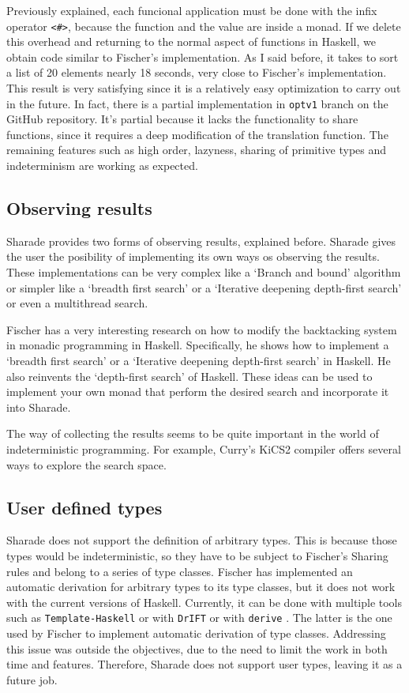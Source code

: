 \documentclass[class=article, crop=false]{standalone}
\begin{document}
Previously explained, each funcional application must be done with the infix operator
\verb`<#>`, because the function and the value are inside a monad. If we delete this overhead
and returning to the normal aspect of functions in Haskell, we obtain code similar to
Fischer's implementation. As I said before, it takes to sort a list of 20 elements nearly
18 seconds, very close to Fischer's implementation. This result is very satisfying since it
is a relatively easy optimization to carry out in the future. In fact, there is a partial
implementation in \verb`optv1` branch on the GitHub repository. It's partial because it lacks
the functionality to share functions, since it requires a deep modification of the
translation function. The remaining features such as high order, lazyness, sharing of
primitive types and indeterminism are working as expected.

\subsection{Observing results}

Sharade provides two forms of observing results, explained before. Sharade gives the user
the posibility of implementing its own ways os observing the results. These implementations
can be very complex like a `Branch and bound' algorithm or simpler like a `breadth first
search' or a `Iterative deepening depth-first search' or even a multithread search.

Fischer has a very interesting research\cite{fischer2009reinventing} on how to modify the
backtacking system in monadic programming in Haskell. Specifically, he shows how to implement
a `breadth first search' or a `Iterative deepening depth-first search' in Haskell. He also
reinvents the `depth-first search' of Haskell. These ideas can be used to implement your own
monad that perform the desired search and incorporate it into Sharade.

The way of collecting the results seems to be quite important in the world of indeterministic
programming. For example, Curry's KiCS2 compiler offers several ways to explore the search
space\cite{hanus2012search}.

\subsection{User defined types}

Sharade does not support the definition of arbitrary types. This is because those types would
be indeterministic, so they have to be subject to Fischer's Sharing rules and belong to a
series of type classes. Fischer has implemented an automatic derivation for arbitrary types
to its type classes, but it does not work with the current versions of Haskell. Currently, it
can be done with multiple tools such as
\verb`Template-Haskell`\cite {sheard2002template} or with
\verb`DrIFT`\cite{DrIFT} or with \verb`derive` \cite {derive}. The latter is the one used by
Fischer to implement automatic derivation of type classes. Addressing this issue was outside
the objectives, due to the need to limit the work in both time and features. Therefore,
Sharade does not support user types, leaving it as a future job.
\end{document}
